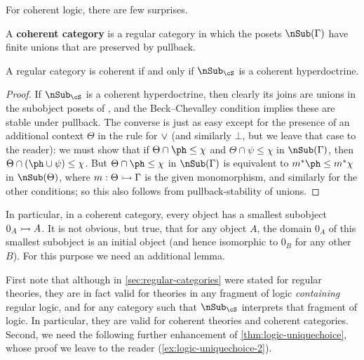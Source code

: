 For coherent logic, there are few surprises.

\begin{defn}
  A \textbf{coherent category} is a regular category in which the posets $\sub(\Gamma)$ have finite unions that are preserved by pullback.
\end{defn}

\begin{thm}\label{thm:coherent-subobjects}
  A regular category \cS is coherent if and only if $\sub_\cS$ is a coherent hyperdoctrine.
\end{thm}
\begin{proof}
  If $\sub_\cS$ is a coherent hyperdoctrine, then clearly its joins are unions in the subobject posets of \cS, and the Beck--Chevalley condition implies these are stable under pullback.
  The converse is just as easy except for the presence of an additional context $\Theta$ in the rule for $\vee$ (and similarly $\bot$, but we leave that case to the reader): we must show that if $\Theta \cap \ph \le \chi$ and $\Theta \cap \psi\le \chi$ in $\sub(\Gamma)$, then $\Theta \cap (\ph\cup \psi) \le \chi$.
  But $\Theta \cap \ph \le \chi$ in $\sub(\Gamma)$ is equivalent to $m^*\ph \le m^*\chi$ in $\sub(\Theta)$, where $m:\Theta\rightarrowtail \Gamma$ is the given monomorphism, and similarly for the other conditions; so this also follows from pullback-stability of unions.
\end{proof}

In particular, in a coherent category, every object has a smallest subobject $0_A \rightarrowtail A$.
It is not obvious, but true, that for any object $A$, the domain $0_A$ of this smallest subobject is an initial object (and hence isomorphic to $0_B$ for any other $B$).
For this purpose we need an additional lemma.

First note that although  in \cref{sec:regular-categories} were stated for regular theories, they are in fact valid for theories in any fragment of logic \emph{containing} regular logic, and for any category \cS such that $\sub_\cS$ interprets that fragment of logic.
In particular, they are valid for coherent theories and coherent categories.
Second, we need the following further enhancement of \cref{thm:logic-uniquechoice}, whose proof we leave to the reader (\cref{ex:logic-uniquechoice-2}).


